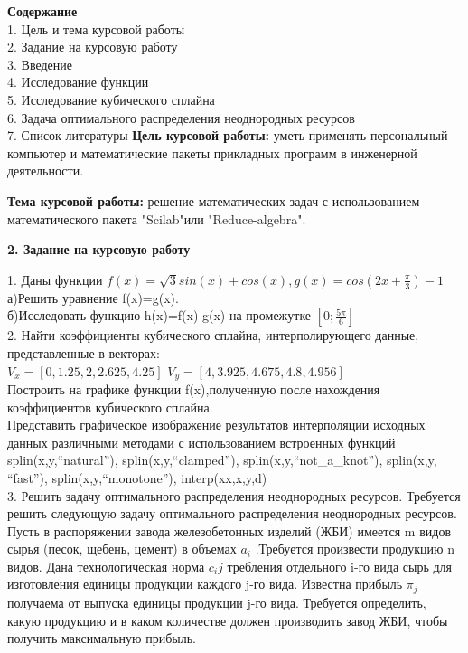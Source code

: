 \documentclass[russian,utf8,nocolumnxxxi,nocolumnxxxii]{eskdtext}
\begin{document}
\maketitle


{\normalsize{\bf{Содержание}}
\\1. Цель и тема курсовой работы
\\2. Задание на курсовую работу
\\3. Введение
\\4. Исследование функции
\\5. Исследование кубического сплайна
\\6. Задача оптимального распределения неоднородных ресурсов
\\7. Список литературы
\newpage
\normalsize{\bf{Цель курсовой работы:}} уметь применять персональный компьютер и
математические пакеты прикладных программ в инженерной деятельности.
\par
\normalsize{\bf{Тема курсовой работы:}} решение математических задач с использованием
математического пакета "Scilab"или "Reduce-algebra".
\newpage
\begin{center}
 {\large\bf2. Задание на курсовую работу}
\end{center}
\normalsize1. Даны функции $f(x)=\sqrt{3}sin(x)+cos(x),g(x)=cos(2x+\frac{\pi}{3})-1$
\\а)Решить уравнение f(x)=g(x).
\\б)Исследовать функцию h(x)=f(x)-g(x) на промежутке $[0;\frac{5\pi}{6}]$
\\2. Найти коэффициенты кубического сплайна, интерполирующего данные, представленные в векторах:\\
$V_{x}=[0,1.25,2,2.625,4.25]$
$V_{y}=[4,3.925,4.675,4.8,4.956]$\\
Построить на графике функции f(x),полученную после нахождения коэффициентов кубического сплайна. \\
Представить графическое изображение результатов интерполяции исходных данных различными методами с использованием встроенных функций\\ splin(x,y,“natural”), splin(x,y,“clamped”), splin(x,y,“not\_a\_knot”), splin(x,y, “fast”), splin(x,y,“monotone”), interp(xx,x,y,d)\\
3. Решить задачу оптимального распределения неоднородных ресурсов.
Требуется решить следующую задачу оптимального распределения неоднородных ресурсов. Пусть в распоряжении завода железобетонных изделий (ЖБИ) имеется m видов сырья (песок, щебень, цемент) в объемах ${ a_i}$  .Требуется произвести продукцию { n} видов. Дана технологическая норма $c_ij$  требления отдельного i-го вида сырь для изготовления единицы продукции каждого j-го вида. Известна прибыль $\pi_j$  получаема от выпуска единицы продукции j-го вида. Требуется определить, какую продукцию и в каком количестве должен производить завод ЖБИ, чтобы получить максимальную прибыль.
}
\end{document}
